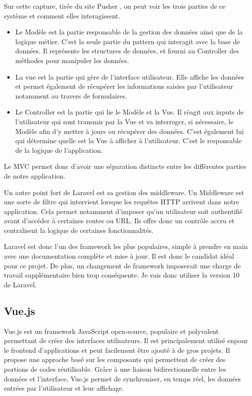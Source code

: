 Sur cette capture, tirée du site Pusher \cite{MVC}, on peut voir les trois parties de ce système et comment elles interagissent.
\begin{itemize}
    \item Le Modèle est la partie responsable de la gestion des données ainsi que de la logique métier. C'est la seule partie du pattern qui interagit avec la base de données. Il représente les structures de données, et fourni au Controller des méthodes pour manipuler les données.
    \item La vue est la partie qui gère de l'interface utilisateur. Elle affiche les données et permet également de récupérer les informations saisies par l'utilisateur notamment au travers de formulaires.
    \item Le Controller est la partie qui lie le Modèle et la Vue. Il réagit aux inputs de l'utilisateur qui sont transmis par la Vue et va interroger, si nécessaire, le Modèle afin d'y metter à jours ou récupérer des données. C'est également lui qui détermine quelle est la Vue à afficher à l'utilisateur. C'est le responsable de la logique de l'application.
\end{itemize}
Le MVC permet donc d'avoir une séparation distincte entre les différentes parties de notre application.

Un autre point fort de Laravel est sa gestion des middleware. Un Middleware est une sorte de filtre qui intervient lorsque les requêtes HTTP arrivent dans notre application. Cela permet notamment d'imposer qu'un utilisateur soit authentifié avant d'accéder à certaines routes ou URL. Ils offre donc un contrôle accru et centralisent la logique de certaines fonctionnalités.

Laravel est donc l'un des framework les plus populaires, simple à prendre en main avec une documentation complète et mise à jour. Il est donc le candidat idéal pour ce projet. De plus, un changement de framework imposerait une charge de travail supplémentaire bien trop conséquente.
Je vais donc utiliser la version 10 de Laravel.

\subsection{Vue.js}
Vue.js est un framework JavaScript open-source, populaire et polyvalent permettant de créer des interfaces utilisateurs. Il est principalement utilisé enpour le frontend d'applications et peut facilement être ajouté à de gros projets. Il propose une approche basé sur les composants qui permettent de créer des portions de codes réutilisable. Grâce à une liaison bidirectionnelle entre les données et l'interface, Vue.js permet de synchroniser, en temps réel, les données entrées par l'utilisateur et leur affichage.

